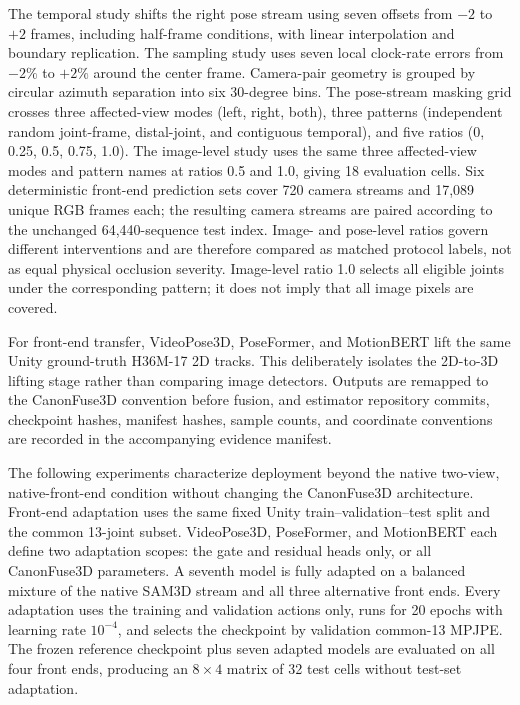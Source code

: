 \documentclass[11pt,letterpaper]{article}
\begin{document}
The temporal study shifts the right pose stream using seven offsets from \(-2\) to \(+2\) frames, including half-frame conditions, with linear interpolation and boundary replication. The sampling study uses seven local clock-rate errors from \(-2\%\) to \(+2\%\) around the center frame. Camera-pair geometry is grouped by circular azimuth separation into six 30-degree bins. The pose-stream masking grid crosses three affected-view modes (left, right, both), three patterns (independent random joint-frame, distal-joint, and contiguous temporal), and five ratios (0, 0.25, 0.5, 0.75, 1.0). The image-level study uses the same three affected-view modes and pattern names at ratios 0.5 and 1.0, giving 18 evaluation cells. Six deterministic front-end prediction sets cover 720 camera streams and 17,089 unique RGB frames each; the resulting camera streams are paired according to the unchanged 64,440-sequence test index. Image- and pose-level ratios govern different interventions and are therefore compared as matched protocol labels, not as equal physical occlusion severity. Image-level ratio 1.0 selects all eligible joints under the corresponding pattern; it does not imply that all image pixels are covered.

For front-end transfer, VideoPose3D, PoseFormer, and MotionBERT lift the same Unity ground-truth H36M-17 2D tracks. This deliberately isolates the 2D-to-3D lifting stage rather than comparing image detectors. Outputs are remapped to the CanonFuse3D convention before fusion, and estimator repository commits, checkpoint hashes, manifest hashes, sample counts, and coordinate conventions are recorded in the accompanying evidence manifest.

The following experiments characterize deployment beyond the native two-view, native-front-end condition without changing the CanonFuse3D architecture. Front-end adaptation uses the same fixed Unity train--validation--test split and the common 13-joint subset. VideoPose3D, PoseFormer, and MotionBERT each define two adaptation scopes: the gate and residual heads only, or all CanonFuse3D parameters. A seventh model is fully adapted on a balanced mixture of the native SAM3D stream and all three alternative front ends. Every adaptation uses the training and validation actions only, runs for 20 epochs with learning rate \(10^{-4}\), and selects the checkpoint by validation common-13 MPJPE. The frozen reference checkpoint plus seven adapted models are evaluated on all four front ends, producing an \(8\times4\) matrix of 32 test cells without test-set adaptation.
\end{document}
